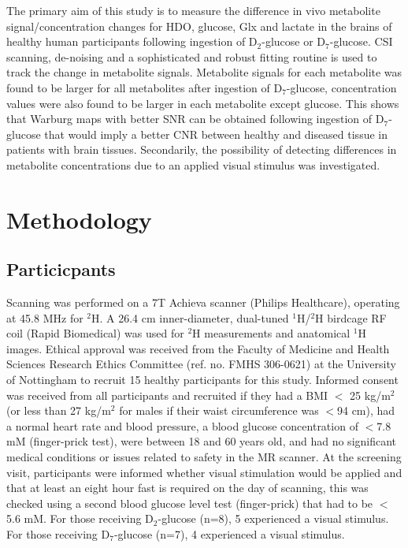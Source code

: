 The primary aim of this study is to measure the difference in vivo metabolite signal/concentration changes for \ac{HDO}, glucose, Glx and lactate in the brains of healthy human participants following ingestion of D$_2$-glucose or D$_7$-glucose. \ac{CSI} scanning, de-noising and a sophisticated and robust fitting routine is used to track the change in metabolite signals. Metabolite signals for each metabolite was found to be larger for all metabolites after ingestion of D$_7$-glucose, concentration values were also found to be larger in each metabolite except glucose. This shows that Warburg maps with better SNR can be obtained following ingestion of D$_7$-glucose that would imply a better \ac{CNR} between healthy and diseased tissue in patients with brain tissues. Secondarily, the possibility of detecting differences in metabolite concentrations due to an applied visual stimulus was investigated.  

\section{Methodology}

\subsection{Particicpants}

Scanning was performed on a 7T Achieva scanner (Philips Healthcare), operating at 45.8 MHz for $^2$H. A 26.4 cm inner-diameter, dual-tuned $^1$H/$^2$H birdcage \ac{RF} coil (Rapid Biomedical) was used for $^2$H measurements and anatomical $^1$H images. Ethical approval was received from the Faculty of Medicine and Health Sciences Research Ethics Committee (ref. no. FMHS 306-0621) at the University of Nottingham to recruit 15 healthy participants for this study. Informed consent was received from all participants and recruited if they had a \ac{BMI} $<$ 25 kg/m$^2$ (or less than 27 kg/m$^2$ for males if their waist circumference was $<$94 cm), had a normal heart rate and blood pressure, a blood glucose concentration of $<$7.8 mM (finger-prick test), were between 18 and 60 years old, and had no significant medical conditions or issues related to safety in the MR scanner. At the screening visit, participants were informed whether visual stimulation would be applied and that at least an eight hour fast is required on the day of scanning, this was checked using a second blood glucose level test (finger-prick) that had to be $<$5.6 mM. For those receiving D$_2$-glucose (n=8), 5 experienced a visual stimulus. For those receiving D$_7$-glucose (n=7), 4 experienced a visual stimulus.


